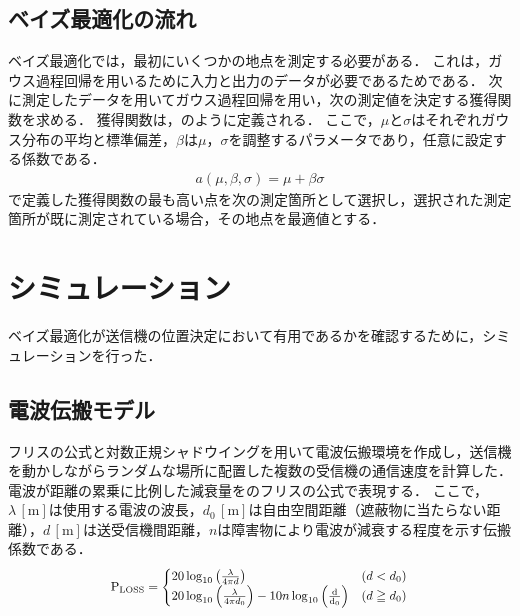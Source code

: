 \documentclass[twocolumn]{ltjarticle}
\begin{document}
\subsection{ベイズ最適化の流れ}

ベイズ最適化では，最初にいくつかの地点を測定する必要がある．
これは，ガウス過程回帰を用いるために入力と出力のデータが必要であるためである．
次に測定したデータを用いてガウス過程回帰を用い，次の測定値を決定する獲得関数を求める．
獲得関数は，のように定義される．
ここで，\(\mu\)と\(\sigma\)はそれぞれガウス分布の平均と標準偏差，\(\beta\)は\(\mu\)，\(\sigma\)を調整するパラメータであり，任意に設定する係数である．
\begin{align}
	a(\mu, \beta, \sigma) = \mu + \beta \sigma \label{eq:acquisition}
\end{align}
で定義した獲得関数の最も高い点を次の測定箇所として選択し，選択された測定箇所が既に測定されている場合，その地点を最適値とする．
\section{シミュレーション}

ベイズ最適化が送信機の位置決定において有用であるかを確認するために，シミュレーションを行った．
\subsection{電波伝搬モデル}

フリスの公式と対数正規シャドウイングを用いて電波伝搬環境を作成し，送信機を動かしながらランダムな場所に配置した複数の受信機の通信速度を計算した．
電波が距離の累乗に比例した減衰量をのフリスの公式で表現する．
ここで，\(\lambda\,\mathrm{[m]}\)は使用する電波の波長，\(d_0\,\mathrm{[m]}\)は自由空間距離（遮蔽物に当たらない距離），\(d\,\mathrm{[m]}\)は送受信機間距離，\(n\)は障害物により電波が減衰する程度を示す伝搬係数である．
\begin{align}
	\scalebox{0.9}{
		\(
		\mathrm{P_{LOSS}} =
		\begin{cases}
			20 \log_{10} \left( \frac{\lambda}{4 \pi d} \right)                                                         & (d < d_0)     \\
			20 \log_{10} \left( \frac{\lambda}{4 \pi d_0} \right) - 10n \log_{10} \left( \mathrm{\frac{d}{d_0}} \right) & (d \geqq d_0)
		\end{cases} \label{eq:friss}
		\)
	}
\end{align}
\end{document}
